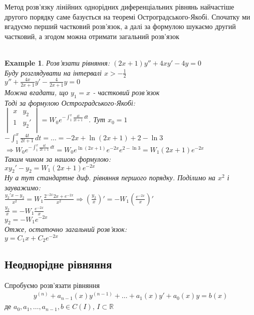\documentclass[a4paper, 10pt]{article}
\theoremstyle{theoremdd}
\theoremstyle{theoremdd}
\theoremstyle{theoremdd}
\theoremstyle{theoremdd}
\newtheorem{example}[theorem]{Example}
\theoremstyle{theoremdd}
\theoremstyle{theoremdd}
\theoremstyle{theoremdd}
\theoremstyle{theoremdd}
\begin{document}
Метод розв'язку лінійних однорідних диференціальних рівнянь найчастіше другого порядку саме базується на теоремі Остроградського-Якобі. Спочатку ми вгадуємо перший частковий розв'язок, а далі за формулою шукаємо другий частковий, а згодом можна отримати загальний розв'язок
\\
\\
\begin{example}
Розв'язати рівняння: $(2x+1)y'' + 4xy' - 4y = 0$\\
Буду розглядувати на інтервалі $\displaystyle x>-\frac{1}{2}$\\
$\displaystyle y'' + \frac{4x}{2x+1}y' - \frac{4}{2x+1}y = 0$\\
Можна вгадати, що $y_1 = x$ - частковий розв'язок\\
Тоді за формулою Остроградського-Якобі:\\
$\displaystyle \begin{vmatrix}
x & y_2 \\
1 & y_2' \\
\end{vmatrix}
= W_0 e^{-\int_{1}^x \frac{4t}{2t+1}\,dt}$. Тут $x_0 = 1$\\
$\displaystyle -\int_{1}^x \frac{4t}{2t+1}\,dt = \dots = -2x + \ln(2x+1) + 2 - \ln3$\\
$\Rightarrow W_0 e^{-\int_{1}^x \frac{4t}{2t+1}\,dt} = W_0 e^{\ln(2x+1)} e^{-2x} e^{2 - \ln3} = W_1(2x+1)e^{-2x}$\\
Таким чином за нашою формулою:\\
$xy_2'-y_2=W_1(2x+1)e^{-2x}$\\
Ну а тут стандартне диф. рівняння першого порядку. Поділимо на $x^2$ і зауважимо:\\
$\displaystyle \frac{y_2'x-y_2}{x^2} = W_1 \frac{2^{-2x}2x + e^{-2x}}{x^2} \Rightarrow \left(\frac{y_2}{x}\right)' = -W_1 \left( \frac{e^{-2x}}{x} \right)'$\\
$\displaystyle \frac{y_2}{x} = -W_1 \frac{e^{-2x}}{x}$\\
$y_2 = -W_1e^{-2x}$\\
Отже, остаточно загальний розв'язок:\\
$y = C_1x + C_2e^{-2x}$
\end{example}

\subsection{Неоднорідне рівняння}
Спробуємо розв'язати рівняння
\begin{align*}
y^{(n)} + a_{n-1}(x)y^{(n-1)}+\dots+a_1(x)y'+a_0(x)y = b(x)
\end{align*}
де $a_0, a_1,\dots,a_{n-1}, b\in C(I)$, $I \subset \mathbb{R}$
\end{document}
